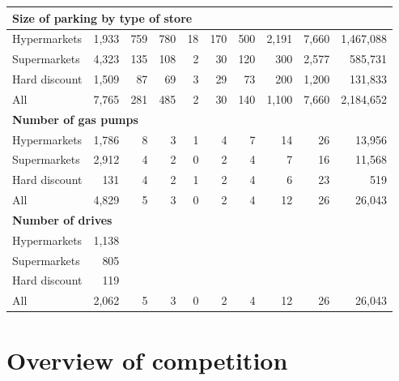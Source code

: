 \documentclass[11pt]{article}
\begin{document}
\begin{table}[H]
\begin{tabular}{lrrrrrrrrr}
\multicolumn{10}{l}{\textbf{Size of parking by type of store}} \\
\midrule
Hypermarkets  &      1,933 &        759 &        780 &         18 &        170 &        500 &      2,191 &      7,660 &  1,467,088 \\
Supermarkets  &      4,323 &        135 &        108 &          2 &         30 &        120 &        300 &      2,577 &    585,731 \\
Hard discount &      1,509 &         87 &         69 &          3 &         29 &         73 &        200 &      1,200 &    131,833 \\
\midrule
All           &      7,765 &        281 &        485 &          2 &         30 &        140 &      1,100 &      7,660 &  2,184,652 \\
\midrule

\multicolumn{10}{l}{\textbf{Number of gas pumps}} \\
\midrule
Hypermarkets  &      1,786 &          8 &          3 &          1 &          4 &          7 &         14 &         26 &     13,956 \\
Supermarkets  &      2,912 &          4 &          2 &          0 &          2 &          4 &          7 &         16 &     11,568 \\
Hard discount &        131 &          4 &          2 &          1 &          2 &          4 &          6 &         23 &        519 \\
\midrule
All           &      4,829 &          5 &          3 &          0 &          2 &          4 &         12 &         26 &     26,043 \\
\midrule

\multicolumn{10}{l}{\textbf{Number of drives}} \\
\midrule
Hypermarkets  &   1,138 & \multicolumn{8}{c}{} \\
Supermarkets  &   805 & \multicolumn{8}{c}{} \ \\
Hard discount  &   119 & \multicolumn{8}{c}{} \ \\
\midrule
All           &    2,062&          5 &          3 &          0 &          2 &          4 &         12 &         26 &     26,043 \\
\bottomrule

\end{tabular}

\end{table}



\section{Overview of competition}
\end{document}
